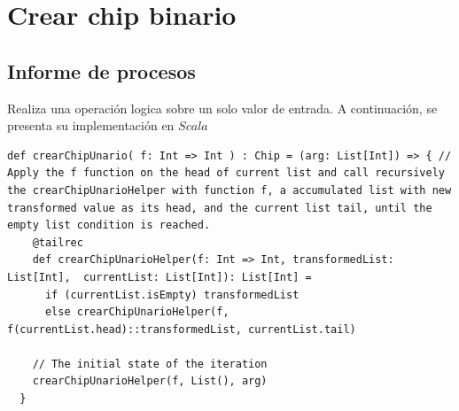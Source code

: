 \documentclass[12pt, a4paper]{article}
\begin{document}
\section{Crear chip binario}
\subsection{Informe de procesos}
Realiza una operación logica sobre un solo valor de entrada. A continuación, se presenta su implementación en $Scala$ \\[16pt]
\begin{lstlisting}[style=scalaStyle, caption=Aplica una operación binaria sobre una valor de entrada.]
  def crearChipUnario( f: Int => Int ) : Chip = (arg: List[Int]) => { // Apply the f function on the head of current list and call recursively the crearChipUnarioHelper with function f, a accumulated list with new transformed value as its head, and the current list tail, until the empty list condition is reached.
    @tailrec
    def crearChipUnarioHelper(f: Int => Int, transformedList: List[Int],  currentList: List[Int]): List[Int] =
      if (currentList.isEmpty) transformedList
      else crearChipUnarioHelper(f, f(currentList.head)::transformedList, currentList.tail)

    // The initial state of the iteration
    crearChipUnarioHelper(f, List(), arg)
  }
\end{lstlisting}
\end{document}
